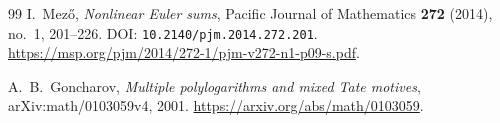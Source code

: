 \documentclass[11pt]{article}
\numberwithin{equation}{section}
\theoremstyle{plain}
\theoremstyle{definition}
\theoremstyle{remark}
\newcommand{\src}[1]{\texttt{\small\nolinkurl{#1}}}
\begin{document}
\begin{thebibliography}{99}
I.~Mez\H{o}, \emph{Nonlinear Euler sums},
Pacific Journal of Mathematics \textbf{272} (2014), no.~1, 201--226.
DOI: \src{10.2140/pjm.2014.272.201}.
\url{https://msp.org/pjm/2014/272-1/pjm-v272-n1-p09-s.pdf}.

A.~B.~Goncharov, \emph{Multiple polylogarithms and mixed Tate motives},
arXiv:math/0103059v4, 2001.
\url{https://arxiv.org/abs/math/0103059}.


\end{thebibliography}
\end{document}
